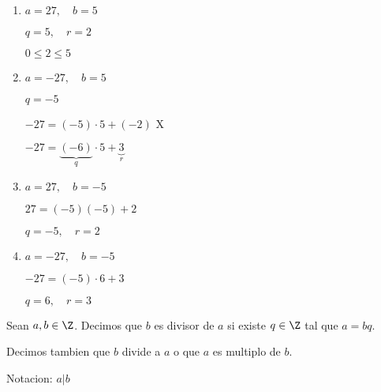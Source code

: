 \begin{example}
	~\begin{enumerate}
		\item \(a = 27, \quad b = 5 \)

		      \(q = 5, \quad r = 2 \)

		      \(0 \leq 2 \leq 5 \)
		\item \(a = -27, \quad b = 5 \)

		      \(q = -5\)

		      \(-27 = (-5) \cdot 5 + (-2) \) X

		      \(-27 = \underbrace{(-6)}_{q} \cdot 5 + \underbrace{3}_{r} \)

		\item \(a = 27, \quad b = -5 \)

		      \(27 = (-5)(-5) + 2 \)

		      \(q = -5, \quad r = 2 \)

		\item \(a = -27, \quad b = -5\)

		      \(-27 = (-5) \cdot 6 + 3 \)

		      \(q = 6, \quad r = 3\)
	\end{enumerate}
\end{example}

\begin{definition}
	Sean \(a, b \in \Z \). Decimos que \(b \) es divisor de \(a \) si existe \(q \in \Z \) tal que \(a = bq \).

	Decimos tambien que \(b \) divide a \(a \) o que \(a \) es multiplo de \(b \).

	Notacion: \(a|b\)
\end{definition}

